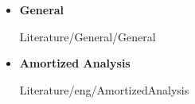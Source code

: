 \begin{itemize}
  \item
    \textbf{General}
    \begin{btSect}{Literature/General/General}
      \btPrintAll
    \end{btSect}
\end{itemize}
\newpage
\begin{itemize}
  \item
    \textbf{Amortized Analysis}
    \begin{btSect}{Literature/eng/AmortizedAnalysis}
      \btPrintAll
    \end{btSect}
\end{itemize}